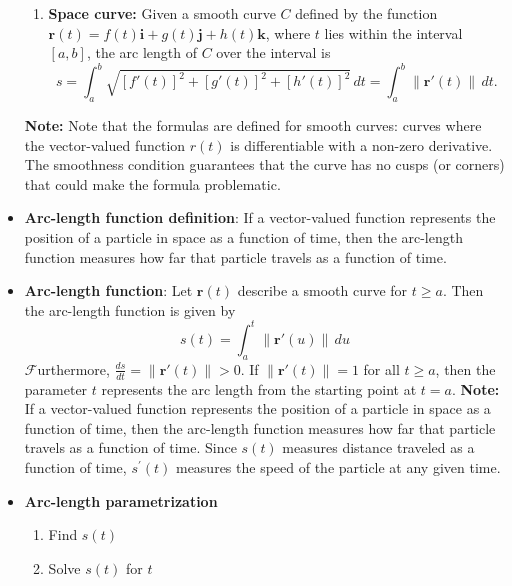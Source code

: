 \documentclass{report}
\begin{document}
\begin{itemize}
\begin{enumerate}
                \item \textbf{Space curve:} Given a smooth curve $C$ defined by the function $\mathbf{r}(t) = f(t)\mathbf{i} + g(t)\mathbf{j} + h(t)\mathbf{k}$, where $t$ lies within the interval $[a,b]$, the arc length of $C$ over the interval is
                    \begin{equation}
                        s = \int_{a}^{b} \sqrt{[f'(t)]^2 + [g'(t)]^2 + [h'(t)]^2} \, dt = \int_{a}^{b} \|\mathbf{r}'(t)\| \, dt.
                    \end{equation}
            \end{enumerate}
            \bigbreak \noindent 
            \textbf{Note:} Note that the formulas are defined for smooth curves: curves where the vector-valued function $r(t)$ is differentiable with a non-zero derivative. The smoothness condition guarantees that the curve has no cusps (or corners) that could make the formula problematic.
        \item \textbf{Arc-length function definition}: If a vector-valued function represents the position of a particle in space as a function of time, then the arc-length function measures how far that particle travels as a function of time.
        \item \textbf{Arc-length function}:
            Let $\mathbf{r}(t)$ describe a smooth curve for $t \geq a$. Then the arc-length function is given by
            \begin{equation}
                s(t) = \int_{a}^{t} \|\mathbf{r}'(u)\| \, du
            \end{equation}
            $\mathscr{F}$urthermore, $\frac{ds}{dt} = \|\mathbf{r}'(t)\| > 0$. If $\|\mathbf{r}'(t)\| = 1$ for all $t \geq a$, then the parameter $t$ represents the arc length from the starting point at $t = a$.
            \bigbreak \noindent 
            \textbf{Note:} If a vector-valued function represents the position of a particle in space as a function of time, then the arc-length function measures how far that particle travels as a function of time.
            \bigbreak \noindent 
            Since  $s(t)$ measures distance traveled as a function of time,  $s^{\prime}(t)$ measures the speed of the particle at any given time.
            \bigbreak \noindent 
        \item \textbf{Arc-length parametrization}
            \begin{enumerate}
                \item Find $s(t)$
                \item Solve $s(t)$ for $t$

\end{enumerate}
\end{itemize}
\end{document}
